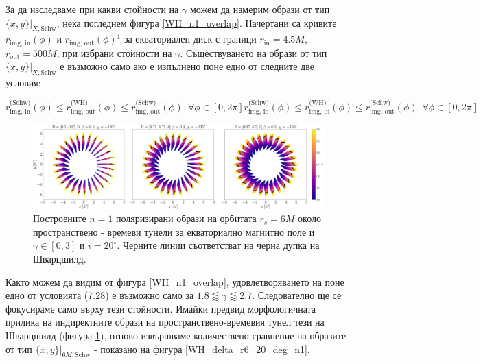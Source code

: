 За да изследваме при какви стойности на $\gamma$ можем да намерим образи от тип $\{x,y\}\vert_{X, \text{Schw}}$, нека погледнем фигура \ref{WH_n1_overlap}. Начертани са кривите $r_\text{img, in}(\phi)$ и $r_\text{img, out}(\phi)$$^1$ за екваториален диск с граници $r_\text{in} = 4.5M$, $r_\text{out} = 500M$, при избрани стойности на $\gamma$. Съществуването на образи от тип $\{x,y\}\vert_{X, \text{Schw}}$ е възможно само ако е изпълнено поне едно от следните две условия:


\begin{subequations}
	\begin{equation}
		r_\text{img, in}^{\text{(Schw)}}(\phi) \le r_\text{img, out}^{\text{(WH)}}(\phi) \le r_\text{img, out}^{\text{(Schw)}}(\phi)\,\,\, \forall\phi\in[0,2\pi]
	\end{equation}
	\begin{equation}
		r_\text{img, in}^{\text{(Schw)}}(\phi) \le r_\text{img, in}^{\text{(WH)}}(\phi) \le r_\text{img, out}^{\text{(Schw)}}(\phi)\,\,\, \forall\phi\in[0,2\pi]
	\end{equation}
\end{subequations}
\newpage
\begin{figure}[!htb]
	\hspace{-0.5cm}
	\includegraphics[scale = 0.15]{WH_alpha_Eq_Field_n1.png}
	\caption[Поляризирани $n=1$ образи около пространствено - времеви тунели за екваториално магнитно поле.]{\small Построените $n=1$ поляризирани образи на орбитата $r_s = 6M$ около пространствено - времеви тунели за екваториално магнитно поле и $\gamma \in[0,3]$ и $i = 20^\circ$. Черните линии съответстват на черна дупка на Шварцшилд.} 
	\label{WH_pol_eq_field_n1}
\end{figure}

\lfoot{}
Както можем да видим от фигура \ref{WH_n1_overlap}, удовлетворяването на поне едно от условията (7.28) е възможно само за  $1.8 \lessapprox \gamma \lessapprox 2.7$. Следователно ще се фокусираме само върху тези стойности. Имайки предвид морфологичната прилика на индиректните образи на пространствено-времевия тунел тези на Шварцшилд (фигура \ref{WH_pol_eq_field_n1}), отново извършваме количествено сравнение на образите от тип $\{x,y\}\vert_{6M, \text{Schw}}$ - показано на фигура \ref{WH_delta_r6_20_deg_n1}.\\

